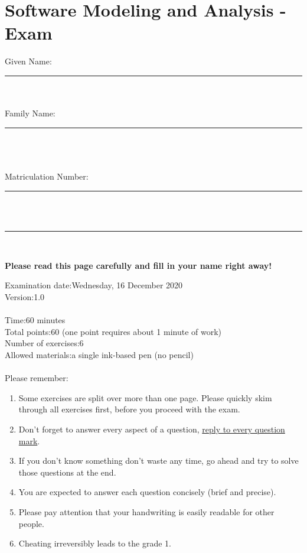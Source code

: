 \documentclass [11pt, a4wide, twoside]{article}
\begin{document}
\section*{Software Modeling and Analysis - Exam}
Given Name:\tabto{4cm}\rule{100pt}{0.5pt}\\[1mm]\\
Family Name:\tabto{4cm}\rule{100pt}{0.5pt}\\[1mm]\\\\
Matriculation Number:\tabto{4cm}\rule{100pt}{0.5pt}\\[1mm]\\
\rule{\textwidth}{1pt}\\[1mm]
\begin{center}
\textbf{Please read this page carefully and fill in your name right away!}
\end{center}
\vspace{1cm}
Examination date:\tabto{4.5cm}Wednesday, 16 December 2020\\
Version:\tabto{4.5cm}1.0\\\\
Time:\tabto{4.5cm}60 minutes\\
Total points:\tabto{4.5cm}60 (one point requires about 1 minute of work)\\
Number of exercises:\tabto{4.5cm}6\\
Allowed materials:\tabto{4.5cm}a single ink-based pen (no pencil)\\\\

\noindent Please remember:
\begin{enumerate}
\item Some exercises are split over more than one page. Please quickly skim through all exercises first, before you proceed with the exam.
\item Don't forget to answer every aspect of a question, \ie \underline{reply to every question mark}.
\item If you don't know something don't waste any time, go ahead and try to solve those questions at the end.
\item You are expected to answer each question concisely (brief and precise).
\item Please pay attention that your handwriting is easily readable for other people.
\item Cheating irreversibly leads to the grade 1.
\end{enumerate}
\end{document}
